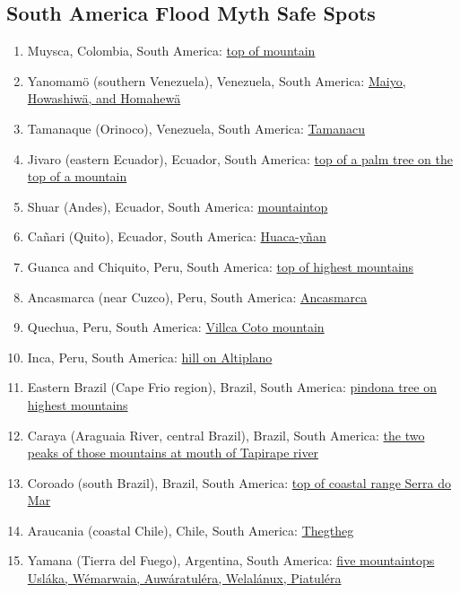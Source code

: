 \documentclass[10pt,twocolumn,letterpaper]{article}
\begin{document}
\subsection{South America Flood Myth Safe Spots}

\begin{flushleft}
\begin{enumerate}
\item Muysca, Colombia, South America: \href{http://www.talkorigins.org/faqs/flood-myths.html#Muysca}{top of mountain}
\item Yanomamö (southern Venezuela), Venezuela, South America: \href{http://www.talkorigins.org/faqs/flood-myths.html#Yanomamo}{Maiyo, Howashiwä, and Homahewä}
\item Tamanaque (Orinoco), Venezuela, South America: \href{http://www.talkorigins.org/faqs/flood-myths.html#Tamanaque}{Tamanacu}
\item Jivaro (eastern Ecuador), Ecuador, South America: \href{http://www.talkorigins.org/faqs/flood-myths.html#Jivaro}{top of a palm tree on the top of a mountain}
\item Shuar (Andes), Ecuador, South America: \href{http://www.talkorigins.org/faqs/flood-myths.html#Shuar}{mountaintop}
\item Cañari (Quito), Ecuador, South America: \href{http://www.talkorigins.org/faqs/flood-myths.html#Canari}{Huaca-yñan}
\item Guanca and Chiquito, Peru, South America: \href{http://www.talkorigins.org/faqs/flood-myths.html#Guanca}{top of highest mountains}
\item Ancasmarca (near Cuzco), Peru, South America: \href{http://www.talkorigins.org/faqs/flood-myths.html#Ancasmarca}{Ancasmarca}
\item Quechua, Peru, South America: \href{http://www.talkorigins.org/faqs/flood-myths.html#Quechua}{Villca Coto mountain}
\item Inca, Peru, South America: \href{http://www.talkorigins.org/faqs/flood-myths.html#Inca}{hill on Altiplano}
\item Eastern Brazil (Cape Frio region), Brazil, South America: \href{http://www.talkorigins.org/faqs/flood-myths.html#CapeFrio}{pindona tree on highest mountains}
\item Caraya (Araguaia River, central Brazil), Brazil, South America: \href{http://www.talkorigins.org/faqs/flood-myths.html#Caraya}{the two peaks of those mountains at mouth of Tapirape river}
\item Coroado (south Brazil), Brazil, South America: \href{http://www.talkorigins.org/faqs/flood-myths.html#Coroado}{top of coastal range Serra do Mar}
\item Araucania (coastal Chile), Chile, South America: \href{http://www.talkorigins.org/faqs/flood-myths.html#Araucania}{Thegtheg}
\item Yamana (Tierra del Fuego), Argentina, South America: \href{http://www.talkorigins.org/faqs/flood-myths.html#Yamana}{five mountaintops Usláka, Wémarwaia, Auwáratuléra, Welalánux, Piatuléra}
\end{enumerate}
\end{flushleft}
\end{document}

